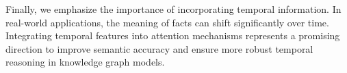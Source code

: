 Finally, we emphasize the importance of incorporating temporal information. In real-world applications, the meaning of facts can shift significantly over time. Integrating temporal features into attention mechanisms represents a promising direction to improve semantic accuracy and ensure more robust temporal reasoning in knowledge graph models.


%


